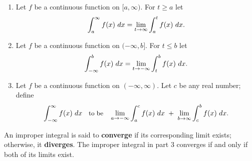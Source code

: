 {\begin{enumerate}
\item		Let $f$ be a continuous function on $[a,\infty)$. For $t \geq a$ let 
$$\small\int_a^\infty f(x)\ dx = \lim_{t\to\infty}\int_a^t f(x)\ dx.$$

\item		Let $f$ be a continuous function on $(-\infty,b]$. For $t \leq b$ let
$$\small\int_{-\infty}^b f(x)\ dx = \lim_{t\to-\infty}\int_t^b f(x)\ dx.$$

\item		Let $f$ be a continuous function on $(-\infty,\infty)$. Let $c$ be any real number; define
$$\small\int_{-\infty}^\infty f(x)\ dx \quad \text{to be}\quad \lim_{a\to-\infty}\int_a^c f(x)\ dx\ +\ \lim_{b\to\infty}\int_c^b f(x)\ dx.$$
\end{enumerate}}

An improper integral is said to \textbf{converge} if its corresponding limit exists; otherwise, it \textbf{diverges}. The improper integral in part 3 converges if and only if both of its limits exist.


